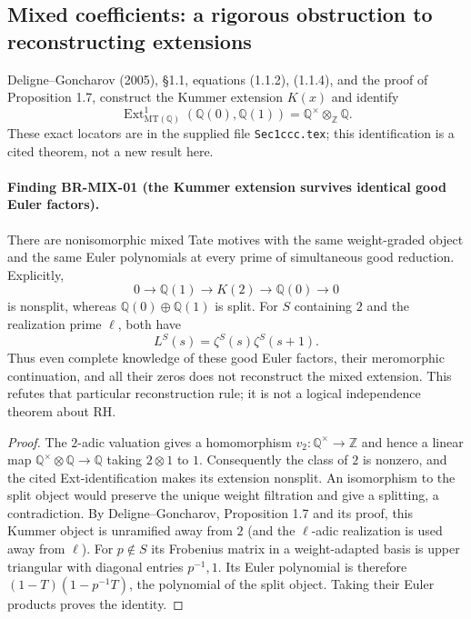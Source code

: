 \documentclass[11pt,a4paper]{article}
\theoremstyle{definition}\newtheorem{definition}[theorem]{Definition}
\theoremstyle{remark}\newtheorem{remark}[theorem]{Remark}
\begin{document}
\subsection{Mixed coefficients: a rigorous obstruction to reconstructing extensions}

Deligne--Goncharov (2005), \S1.1, equations (1.1.2), (1.1.4), and the
proof of Proposition 1.7, construct the Kummer extension $K(x)$ and
identify
\[
 \operatorname{Ext}^1_{\mathrm{MT}(\mathbb Q)}
   (\mathbb Q(0),\mathbb Q(1))=\mathbb Q^\times\otimes_{\mathbb Z}\mathbb Q.
\]
These exact locators are in the supplied file \nolinkurl{Sec1ccc.tex}; this
identification is a cited theorem, not a new result here.

\paragraph{Finding BR-MIX-01 (the Kummer extension survives identical
good Euler factors).}
There are nonisomorphic mixed Tate motives with the same weight-graded
object and the same Euler polynomials at every prime of simultaneous
good reduction.  Explicitly,
\[
 0\longrightarrow\mathbb Q(1)\longrightarrow K(2)
 \longrightarrow\mathbb Q(0)\longrightarrow0
\]
is nonsplit, whereas $\mathbb Q(0)\oplus\mathbb Q(1)$ is split.  For
$S$ containing $2$ and the realization prime $\ell$, both have
\[
 L^S(s)=\zeta^S(s)\zeta^S(s+1).
\]
Thus even complete knowledge of these good Euler factors, their
meromorphic continuation, and all their zeros does not reconstruct
the mixed extension.  This refutes that particular reconstruction
rule; it is not a logical independence theorem about RH.

\begin{proof}
The $2$-adic valuation gives a homomorphism
$v_2:\mathbb Q^\times\to\mathbb Z$ and hence a linear map
$\mathbb Q^\times\otimes\mathbb Q\to\mathbb Q$ taking $2\otimes1$
to $1$.  Consequently the class of $2$ is nonzero, and the cited
Ext-identification makes its extension nonsplit.  An isomorphism to
the split object would preserve the unique weight filtration and
give a splitting, a contradiction.  By Deligne--Goncharov,
Proposition 1.7 and its proof, this Kummer object is unramified away
from $2$ (and the $\ell$-adic realization is used away from $\ell$).
For $p\notin S$ its Frobenius matrix in a weight-adapted basis is
upper triangular with diagonal entries $p^{-1},1$.  Its Euler
polynomial is therefore $(1-T)(1-p^{-1}T)$, the polynomial of the
split object.  Taking their Euler products proves the identity.
\end{proof}
\end{document}

